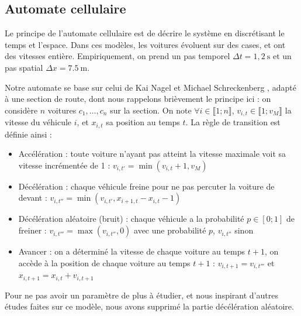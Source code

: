 \documentclass[11pt]{article}
\begin{document}
	\subsection{Automate cellulaire}
	Le principe de l'automate cellulaire est de décrire le système en discrétisant le temps et l'espace. Dans ces modèles, les voitures évoluent sur des cases, et ont des vitesses entière. Empiriquement, on prend un pas temporel $\Delta t = 1,2~\mathrm{s}$ et un pas spatial $\Delta x = 7.5~\mathrm{m}$. \par
	Notre automate se base sur celui de Kai Nagel et Michael Schreckenberg \cite{NaSch}, adapté à une section de route, dont nous rappelons brièvement le principe ici : on considère $n$ voitures $c_1, … , c_n$ sur la section. On note $\forall i \in \llbracket 1;n \rrbracket$, $v_{i,t} \in \llbracket 1;v_M \rrbracket$ la vitesse du véhicule $i$, et $x_{i,t}$ sa position au temps $t$. La règle de transition est définie ainsi :
	\begin{itemize}
		\item Accélération : toute voiture n'ayant pas atteint la vitesse maximale voit sa vitesse incrémentée de 1 : $v_{i,t'} = \min(v_{i,t} + 1, v_M)$
		\item Décélération : chaque véhicule freine pour ne pas percuter la voiture de devant : $v_{i,t''} = \min(v_{i,t'},x_{i+1,t}-x_{i,t}-1)$
		\item Décélération aléatoire (bruit) : chaque véhicule a la probabilité $p \in [ 0;1 ]$ de freiner : $v_{i,t'''} = \max(v_{i,t''},0)$ avec une probabilité $p$, $v_{i,t''}$ sinon
		\item Avancer : on a déterminé la vitesse de chaque voiture au temps $t+1$, on accède à la position de chaque voiture au temps $t+1$ : $v_{i,t+1} = v_{i,t'''}$ et $x_{i,t+1} = x_{i,t} + v_{i,t+1}$
	\end{itemize}
	
	Pour ne pas avoir un paramètre de plus à étudier, et nous inspirant d'autres études faites sur ce modèle\cite{ChPh}, nous avons supprimé la partie décélération aléatoire.
\end{document}
